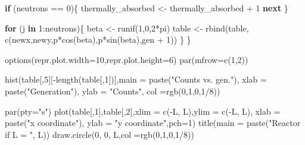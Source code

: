 \documentclass[11pt]{article}
\newenvironment{Shaded}{}{}
\newcommand{\DecValTok}[1]{\textcolor[rgb]{0.25,0.63,0.44}{{#1}}}
\newcommand{\StringTok}[1]{\textcolor[rgb]{0.25,0.44,0.63}{{#1}}}
\newcommand{\OtherTok}[1]{\textcolor[rgb]{0.00,0.44,0.13}{{#1}}}
\newcommand{\FunctionTok}[1]{\textcolor[rgb]{0.02,0.16,0.49}{{#1}}}
\newcommand{\NormalTok}[1]{{#1}}
\newcommand{\SpecialCharTok}[1]{\textcolor[rgb]{0.25,0.44,0.63}{{#1}}}
\newcommand{\ControlFlowTok}[1]{\textcolor[rgb]{0.00,0.44,0.13}{\textbf{{#1}}}}
\newcommand{\AttributeTok}[1]{\textcolor[rgb]{0.49,0.56,0.16}{{#1}}}
\begin{document}
\begin{Shaded}
\begin{Highlighting}[]
            \ControlFlowTok{if}\NormalTok{ (neutrons }\SpecialCharTok{==} \DecValTok{0}\NormalTok{)\{}
\NormalTok{                thermally\_absorbed }\OtherTok{\textless{}{-}}\NormalTok{ thermally\_absorbed }\SpecialCharTok{+} \DecValTok{1}
                \ControlFlowTok{next}
\NormalTok{                \}}

            \ControlFlowTok{for}\NormalTok{ (j }\ControlFlowTok{in} \DecValTok{1}\SpecialCharTok{:}\NormalTok{neutrons)\{}
\NormalTok{                beta }\OtherTok{\textless{}{-}} \FunctionTok{runif}\NormalTok{(}\DecValTok{1}\NormalTok{,}\DecValTok{0}\NormalTok{,}\DecValTok{2}\SpecialCharTok{*}\NormalTok{pi)}
\NormalTok{                table }\OtherTok{\textless{}{-}} \FunctionTok{rbind}\NormalTok{(table,}
                               \FunctionTok{c}\NormalTok{(newx,newy,p}\SpecialCharTok{*}\FunctionTok{cos}\NormalTok{(beta),p}\SpecialCharTok{*}\FunctionTok{sin}\NormalTok{(beta),gen }\SpecialCharTok{+} \DecValTok{1}\NormalTok{))}
\NormalTok{                \}}
\NormalTok{        \}}
    
        \FunctionTok{options}\NormalTok{(}\AttributeTok{repr.plot.width=}\DecValTok{10}\NormalTok{,}\AttributeTok{repr.plot.height=}\DecValTok{6}\NormalTok{)}
        \FunctionTok{par}\NormalTok{(}\AttributeTok{mfrow=}\FunctionTok{c}\NormalTok{(}\DecValTok{1}\NormalTok{,}\DecValTok{2}\NormalTok{))}

        \FunctionTok{hist}\NormalTok{(table[,}\DecValTok{5}\NormalTok{][}\SpecialCharTok{{-}}\FunctionTok{length}\NormalTok{(table[,}\DecValTok{1}\NormalTok{])],}\AttributeTok{main =} \FunctionTok{paste}\NormalTok{(}\StringTok{"Counts vs. gen."}\NormalTok{),}
             \AttributeTok{xlab =} \FunctionTok{paste}\NormalTok{(}\StringTok{"Generation"}\NormalTok{), }\AttributeTok{ylab =} \StringTok{"Counts"}\NormalTok{,}
            \AttributeTok{col =}\FunctionTok{rgb}\NormalTok{(}\DecValTok{0}\NormalTok{,}\DecValTok{1}\NormalTok{,}\DecValTok{0}\NormalTok{,}\DecValTok{1}\SpecialCharTok{/}\DecValTok{8}\NormalTok{))}

        \FunctionTok{par}\NormalTok{(}\AttributeTok{pty=}\StringTok{"s"}\NormalTok{)}
        \FunctionTok{plot}\NormalTok{(table[,}\DecValTok{1}\NormalTok{],table[,}\DecValTok{2}\NormalTok{],}\AttributeTok{xlim =} \FunctionTok{c}\NormalTok{(}\SpecialCharTok{{-}}\NormalTok{L, L),}\AttributeTok{ylim =} \FunctionTok{c}\NormalTok{(}\SpecialCharTok{{-}}\NormalTok{L, L),}
             \AttributeTok{xlab =} \FunctionTok{paste}\NormalTok{(}\StringTok{"x coordinate"}\NormalTok{), }\AttributeTok{ylab =} \StringTok{"y coordinate"}\NormalTok{,}\AttributeTok{pch=}\DecValTok{1}\NormalTok{)}
        \FunctionTok{title}\NormalTok{(}\AttributeTok{main =} \FunctionTok{paste}\NormalTok{(}\StringTok{"Reactor if L = "}\NormalTok{, L))}
        \FunctionTok{draw.circle}\NormalTok{(}\DecValTok{0}\NormalTok{, }\DecValTok{0}\NormalTok{, L,}\AttributeTok{col =}\FunctionTok{rgb}\NormalTok{(}\DecValTok{0}\NormalTok{,}\DecValTok{1}\NormalTok{,}\DecValTok{0}\NormalTok{,}\DecValTok{1}\SpecialCharTok{/}\DecValTok{8}\NormalTok{))}


\end{Highlighting}
\end{Shaded}
\end{document}
